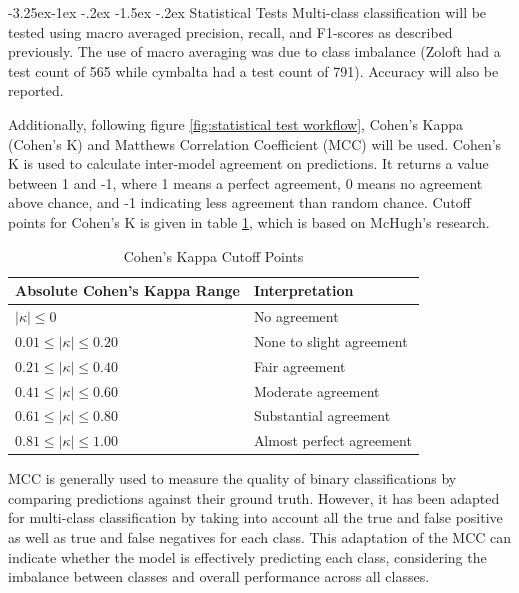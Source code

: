 \documentclass[10.7pt, onecolumn]{article}
\makeatletter
\renewcommand\subsubsection{\@startsection{subsubsection}{3}{\z@}%
	{-3.25ex\@plus -1ex \@minus -.2ex}%
    {-1.5ex \@plus -.2ex}%
    {\normalfont\itshape}}
\makeatother
\begin{document}
\subsubsection{Statistical Tests}
Multi-class classification will be tested using macro averaged precision, recall, and F1-scores as described previously. The use of macro averaging was due to class imbalance (Zoloft had a test count of 565 while cymbalta had a test count of 791). Accuracy will also be reported.

Additionally, following figure \ref{fig:statistical test workflow}, Cohen's Kappa (Cohen's K) and Matthews Correlation Coefficient (MCC) will be used. Cohen's K is used to calculate inter-model agreement on predictions. It returns a value between 1 and -1, where 1 means a perfect agreement, 0 means no agreement above chance, and -1 indicating less agreement than random chance. Cutoff points for Cohen's K is given in table \ref{tab:kappaInterpretation}, which is based on McHugh's research\cite{cohen}.

\begin{table}[H]
  \centering
  \begin{tabular}{|p{4cm}|p{3cm}|}
    \hline
    \textbf{Absolute Cohen's Kappa Range} & \textbf{Interpretation} \\
    \hline
    $|\kappa| \leq 0$ & No agreement \\
    \hline
    $0.01 \leq |\kappa| \leq 0.20$ & None to slight agreement \\
    \hline
    $0.21 \leq |\kappa| \leq 0.40$ & Fair agreement \\
    \hline
    $0.41 \leq |\kappa| \leq 0.60$ & Moderate agreement \\
    \hline
    $0.61 \leq |\kappa| \leq 0.80$ & Substantial agreement \\
    \hline
    $0.81 \leq |\kappa| \leq 1.00$ & Almost perfect agreement \\
    \hline
  \end{tabular}
  \caption{Cohen's Kappa Cutoff Points}
  \label{tab:kappaInterpretation}
\end{table}

MCC is generally used to measure the quality of binary classifications by comparing predictions against their ground truth\cite{mcc}. However, it has been adapted for multi-class classification by taking into account all the true and false positive as well as true and false negatives for each class\cite{mccmulticlass}. This adaptation of the MCC can indicate whether the model is effectively predicting each class, considering the imbalance between classes and overall performance across all classes.
\end{document}
